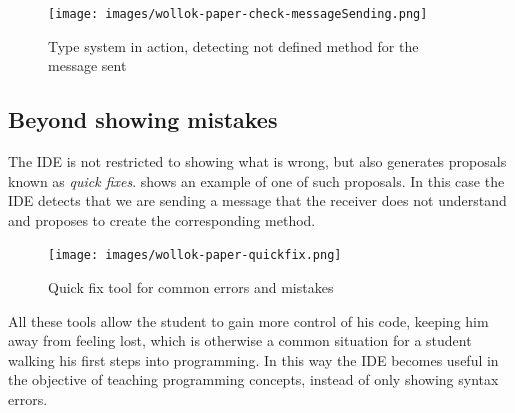 \begin{figure}[ht]
    \centering
	\texttt{[image: images/wollok-paper-check-messageSending.png]}
    \caption{Type system in action, detecting not defined method for the message sent}
    \label{fig:check-messageSending.png}
\end{figure}

\subsection{Beyond showing mistakes}
The IDE is not restricted to showing what is wrong, but also generates proposals known as \emph{quick fixes}.
 shows an example of one of such proposals. 
In this case the IDE detects that we are sending a message that the receiver does not understand and proposes to create the corresponding method.

\begin{figure}[ht]
    \centering
	\texttt{[image: images/wollok-paper-quickfix.png]}
    \caption{Quick fix tool for common errors and mistakes}
    \label{fig:quickfix.png}
\end{figure}

All these tools allow the student to gain more control of his code, keeping him away from feeling lost, 
which is otherwise a common situation for a student walking his first steps into programming.
In this way the IDE becomes useful in the objective of teaching programming concepts, instead of only showing syntax errors.

